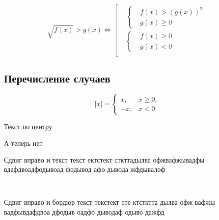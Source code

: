 \documentclass [a4paper,oneside,final,14pt]{extarticle}
\begin{document}
\[ 
	\sqrt{f(x)} > g(x) \Longleftrightarrow 
	\left[ 
	\begin{aligned}
		& \left\{ 
			\begin{aligned}
				& f(x) > (g(x))^2 \\
				& g(x) \geq 0
			\end{aligned}
		  \right . \\
		& \left\{
			\begin{aligned}
				& f(x) \geq 0 \\
				& g(x) < 0
			\end{aligned} 
		  \right . \\
	\end{aligned} \right.
\]

\subsection{Перечисление случаев}

\[ |x| = \begin{cases}
 		x, &x \ge 0, \\
 		-x, &x < 0	
 \end{cases} \]
 
 
 \begin{centering}
 
Текст по центру
 
 \end{centering}
 
 А теперь нет
 
 \hrulefill
 
\null\hfill
\begin{minipage}{0.3\textwidth}
 	Сдвиг вправо и текст текст ектстект сткттадылва офжвафжывадфы вдафдвоадфодывоад фодывод афо дывода жфдывалоф
\end{minipage}\\
 
\null\hfill
\begin{boxedminipage}{0.3\textwidth}
 	Сдвиг вправо и бордюр текст текстект сте ктстктта дылва офж вафжы вадфывдафдвоа дфодыв оадфо дыводаф одыво дажфд
\end{boxedminipage}
\end{document}
